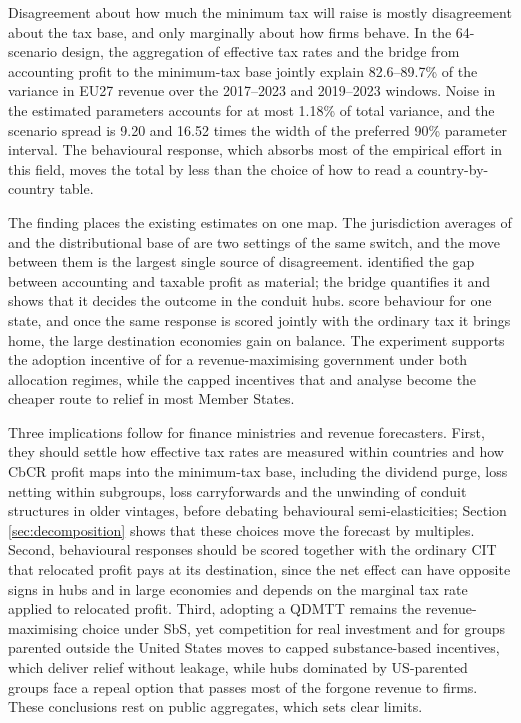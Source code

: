 \documentclass[11pt,a4paper]{article}
\begin{document}
Disagreement about how much the minimum tax will raise is mostly disagreement about the tax base, and only marginally about how firms behave. In the 64-scenario design, the aggregation of effective tax rates and the bridge from accounting profit to the minimum-tax base jointly explain 82.6–89.7\% of the variance in EU27 revenue over the 2017–2023 and 2019–2023 windows. Noise in the estimated parameters accounts for at most 1.18\% of total variance, and the scenario spread is 9.20 and 16.52 times the width of the preferred 90\% parameter interval. The behavioural response, which absorbs most of the empirical effort in this field, moves the total by less than the choice of how to read a country-by-country table.

The finding places the existing estimates on one map. The jurisdiction averages of \citet{barake2022} and the distributional base of \citet{hugger2026} are two settings of the same switch, and the move between them is the largest single source of disagreement. \citet{hanlon2023} identified the gap between accounting and taxable profit as material; the bridge quantifies it and shows that it decides the outcome in the conduit hubs. \citet{boukal2026} score behaviour for one state, and once the same response is scored jointly with the ordinary tax it brings home, the large destination economies gain on balance. The experiment supports the adoption incentive of \citet{devereux2022} for a revenue-maximising government under both allocation regimes, while the capped incentives that \citet{janeba2023} and \citet{schjelderup2024} analyse become the cheaper route to relief in most Member States.

Three implications follow for finance ministries and revenue forecasters. First, they should settle how effective tax rates are measured within countries and how CbCR profit maps into the minimum-tax base, including the dividend purge, loss netting within subgroups, loss carryforwards and the unwinding of conduit structures in older vintages, before debating behavioural semi-elasticities; Section \ref{sec:decomposition} shows that these choices move the forecast by multiples. Second, behavioural responses should be scored together with the ordinary CIT that relocated profit pays at its destination, since the net effect can have opposite signs in hubs and in large economies and depends on the marginal tax rate applied to relocated profit. Third, adopting a QDMTT remains the revenue-maximising choice under SbS, yet competition for real investment and for groups parented outside the United States moves to capped substance-based incentives, which deliver relief without leakage, while hubs dominated by US-parented groups face a repeal option that passes most of the forgone revenue to firms. These conclusions rest on public aggregates, which sets clear limits.
\end{document}

